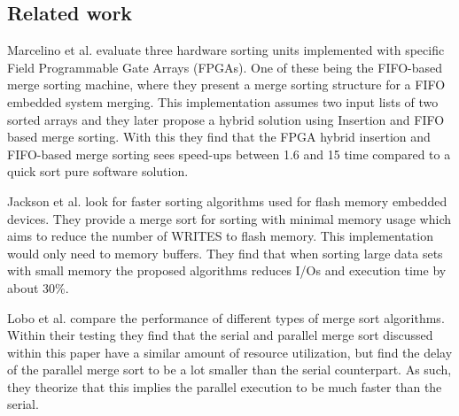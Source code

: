\subsection{Related work}
Marcelino et al. \cite{sorting_units} evaluate three hardware sorting units
implemented with specific Field Programmable Gate Arrays (FPGAs). One of these
being the FIFO-based merge sorting machine, where they present a merge sorting
structure for a FIFO embedded system merging. This implementation assumes two
input lists of two sorted arrays and they later propose a hybrid solution using
Insertion and FIFO based merge sorting. With this they find that the FPGA hybrid
insertion and FIFO-based merge sorting sees speed-ups between 1.6 and 15 time
compared to a quick sort pure software solution.

Jackson et al. \cite{flash_sorting} look for faster sorting algorithms used for
flash memory embedded devices. They provide a merge sort for sorting with
minimal memory usage which aims to reduce the number of WRITES to flash memory.
This implementation would only need to memory buffers. They find that when
sorting large data sets with small memory the proposed algorithms reduces I/Os
and execution time by about 30\%.

Lobo et al. \cite{merge_sort} compare the performance of different types of
merge sort algorithms. Within their testing they find that the serial and
parallel merge sort discussed within this paper have a similar amount of resource
utilization, but find the delay of the parallel merge sort to be a lot smaller
than the serial counterpart. As such, they theorize that this implies the
parallel execution to be much faster than the serial.

